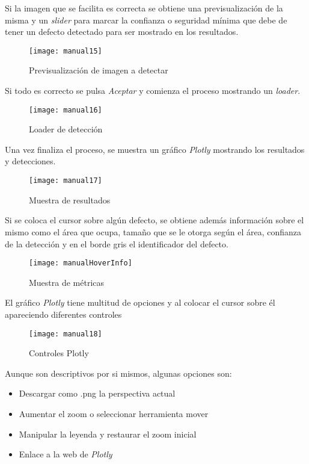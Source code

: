 \clearpage

Si la imagen que se facilita es correcta se obtiene una previsualización de la misma y un \emph{slider} para marcar la confianza o seguridad mínima que debe de tener un defecto detectado para ser mostrado en los resultados.

    \begin{figure}[htb]
	\centering
	\texttt{[image: manual15]}
	\caption[Previsualización de imagen a detectar]{Previsualización de imagen a detectar}
    \end{figure}

Si todo es correcto se pulsa \emph{Aceptar} y comienza el proceso mostrando un \emph{loader}.

    \begin{figure}[htb]
	\centering
	\texttt{[image: manual16]}
	\caption[Loader de detección]{Loader de detección}
    \end{figure}

Una vez finaliza el proceso, se muestra un gráfico \emph{Plotly} mostrando los resultados y detecciones.

    \begin{figure}[htb]
	\centering
	\texttt{[image: manual17]}
	\caption[Muestra de resultados]{Muestra de resultados}
    \end{figure}

Si se coloca el cursor sobre algún defecto, se obtiene además información sobre el mismo como el área que ocupa, tamaño que se le otorga según el área, confianza de la detección y en el borde gris el identificador del defecto.

    \begin{figure}[htb]
	\centering
	\texttt{[image: manualHoverInfo]}
	\caption[Muestra de métricas]{Muestra de métricas}
    \end{figure}

\clearpage

El gráfico \emph{Plotly} tiene multitud de opciones y al colocar el cursor sobre él apareciendo diferentes controles

    \begin{figure}[htb]
	\centering
	\texttt{[image: manual18]}
	\caption[Controles Plotly]{Controles Plotly}
    \end{figure}


Aunque son descriptivos por si mismos, algunas opciones son:

\begin{itemize}
    \item Descargar como .png la perspectiva actual
    \item Aumentar el zoom o seleccionar herramienta mover
    \item Manipular la leyenda y restaurar el zoom inicial
    \item Enlace a la web de \emph{Plotly}
\end{itemize}

